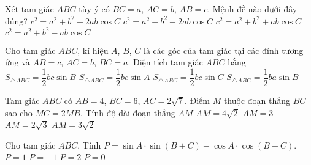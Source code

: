\begin{ex}%
	Xét tam giác $ABC$ tùy ý có $BC=a$, $AC=b$, $AB=c$. Mệnh đề nào dưới đây đúng?
	\choice
	{$c^2=a^2+b^2+2ab \cos C$}
	{\True $c^2=a^2+b^2-2 a b \cos C$}
	{$c^2=a^2+b^2+a b \cos C$}
	{$c^2=a^2+b^2-a b \cos C$}
\end{ex}

\begin{ex}%
	Cho tam giác $ABC$, kí hiệu $A$, $B$, $C$ là các góc của tam giác tại các đỉnh tương ứng và $AB=c$, $AC=b$, $BC=a$. Diện tích tam giác $ABC$ bằng
	\choice
	{$S_{\triangle ABC}=\dfrac{1}{2}bc\sin B$}
	{\True $S_{\triangle ABC}=\dfrac{1}{2}bc\sin A$}
	{$S_{\triangle ABC}=\dfrac{1}{2}bc\sin C$}
	{$S_{\triangle ABC}=\dfrac{1}{2}ba\sin B$}
\end{ex}

\begin{ex}%
	Tam giác $ABC$ có $AB=4$, $BC=6$, $AC=2\sqrt{7}$. Điểm $M$ thuộc đoạn thẳng $BC$ sao cho $MC=2MB$. Tính độ dài đoạn thẳng $AM$
	\choice
	{$AM=4\sqrt{2}$}
	{$AM=3$}
	{\True $AM=2\sqrt{3}$}
	{$AM=3\sqrt{2}$}
\end{ex}

\begin{ex}%
	Cho tam giác $ABC$. Tính $P=\sin A\cdot \sin(B+C)-\cos A \cdot\cos (B+C)$.
	\choice
	{\True$P=1$}
	{$P=-1$}
	{$P=2$}
	{$P=0$}
\end{ex}

